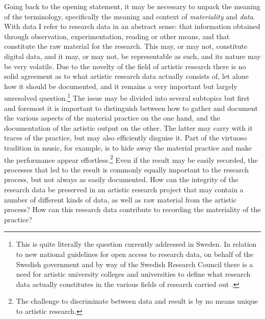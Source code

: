 \documentclass[11pt,a4paper]{article}
\begin{document}
Going back to the opening statement, it may be necessary to unpack the meaning of the terminology, specifically the meaning and context of \emph{materiality} and \emph{data}. With data I refer to research data in an abstract sense: that information obtained through observation, experimentation, reading or other means, and that constitute the raw material for the research. This may, or may not, constitute digital data, and it may, or may not, be representable as such, and its nature may be very volatile.
Due to the novelty of the field of artistic research there is no solid agreement as to what artistic research data actually consists of, let alone how it should be documented, and it remains a very important but largely unresolved question.\footnote{This is quite literally the question currently addressed in Sweden. In relation to new national guidelines for open access to research data, on behalf of the Swedish government and by way of the Swedish Research Council there is a need for artistic university colleges and universities to define what research data actually constitutes in the various fields of research carried out \citep{vr2017}.} The issue may be divided into several subtopics but first and foremost it is important to distinguish between how to gather and document the various aspects of the material practice on the one hand, and the documentation of the artistic output on the other.
The latter may carry with it traces of the practice, but may also efficiently disguise it. Part of the virtuoso tradition in music, for example, is to hide away the material practice and make the performance appear effortless.\footnote{The challenge to discriminate between data and result is by no means unique to artistic research.}
Even if the result may be easily recorded, the processes that led to the result is commonly equally important to the research process, but not always as easily documented. How can the integrity of the research data be preserved in an artistic research project that may contain a number of different kinds of data, as well as raw material from the artistic process?
How can this research data contribute to recording the materiality of the practice?
\end{document}
